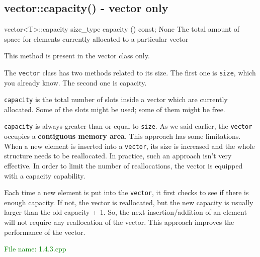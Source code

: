 
\subsection{vector::capacity() - vector only} %
\begin{methodinfo}
  {vector<T>::capacity}
  {size_type capacity () const;}
  {None}
  {The total amount of space for elements currently allocated to a particular vector}
  {This method is present in the vector class only.

  The \texttt{vector} class has two methods related to its size. The first one is \texttt{size}, 
  which you already know. The second one is capacity.

  \texttt{capacity} is the total number of slots inside a vector which are currently allocated. 
  Some of the slots might be used; some of them might be free.

  \texttt{capacity} is always greater than or equal to \texttt{size}. As we said earlier, 
  the \texttt{vector} occupies a \textbf{contiguous memory area}. This approach has some limitations. 
  When a new element is inserted into a \texttt{vector}, its size is increased and the whole structure needs 
  to be reallocated. In practice, such an approach isn’t very effective. In order to limit the number 
  of reallocations, the vector is equipped with a capacity capability.

  Each time a new element is put into the \texttt{vector}, it  first checks to see if there is enough capacity. 
  If not, the vector is reallocated, but the new capacity is usually larger than the old capacity + 1. 
  So, the next insertion/addition of an element will not require any reallocation of the vector. 
  This approach improves the performance of the vector.}
\end{methodinfo}

\textcolor{green}{File name: 1.4.3.cpp}

